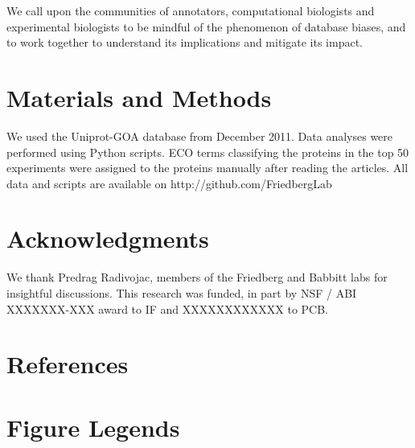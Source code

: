 \documentclass[12pt]{article}
\begin{document}
We call upon the communities of annotators, computational biologists and experimental biologists to be
mindful of the phenomenon of database biases, and to work together to understand its implications and
mitigate its impact.


\section*{Materials and Methods}
We used the Uniprot-GOA database from December 2011. Data analyses were performed using Python scripts.
ECO terms classifying the proteins in the top 50 experiments were assigned to the proteins
manually after reading the articles. All data and scripts are available on
http://github.com/FriedbergLab

\section*{Acknowledgments}
We thank Predrag Radivojac, members of the Friedberg and Babbitt labs for insightful discussions.
This research was funded, in part by NSF / ABI XXXXXXX-XXX award to IF and XXXXXXXXXXXX to PCB.

\section*{References}


\section*{Figure Legends}
\end{document}
